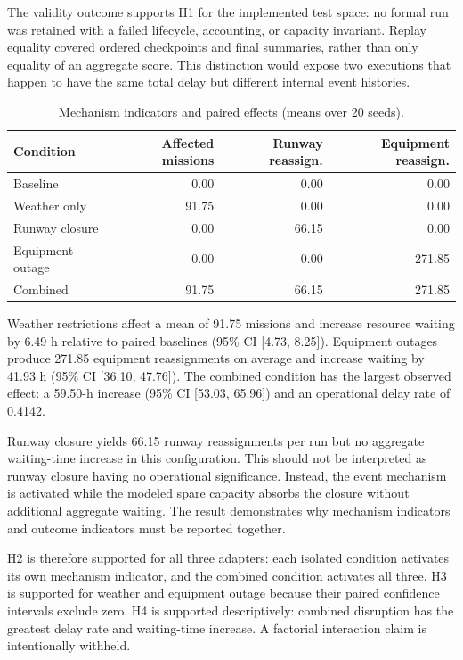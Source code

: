 \documentclass[runningheads]{llncs}
\begin{document}
The validity outcome supports H1 for the implemented test space: no formal run was retained with a failed lifecycle, accounting, or capacity invariant. Replay equality covered ordered checkpoints and final summaries, rather than only equality of an aggregate score. This distinction would expose two executions that happen to have the same total delay but different internal event histories.

\begin{table}[t]
\caption{Mechanism indicators and paired effects (means over 20 seeds).}\label{tab:mechanisms}
\centering\small
\begin{tabular}{lrrr}
\toprule
Condition & Affected missions & Runway reassign. & Equipment reassign. \\
\midrule
Baseline & 0.00 & 0.00 & 0.00 \\
Weather only & 91.75 & 0.00 & 0.00 \\
Runway closure & 0.00 & 66.15 & 0.00 \\
Equipment outage & 0.00 & 0.00 & 271.85 \\
Combined & 91.75 & 66.15 & 271.85 \\
\bottomrule
\end{tabular}
\end{table}

Weather restrictions affect a mean of 91.75 missions and increase resource waiting by 6.49 h relative to paired baselines (95\% CI [4.73, 8.25]). Equipment outages produce 271.85 equipment reassignments on average and increase waiting by 41.93 h (95\% CI [36.10, 47.76]). The combined condition has the largest observed effect: a 59.50-h increase (95\% CI [53.03, 65.96]) and an operational delay rate of 0.4142.

Runway closure yields 66.15 runway reassignments per run but no aggregate waiting-time increase in this configuration. This should not be interpreted as runway closure having no operational significance. Instead, the event mechanism is activated while the modeled spare capacity absorbs the closure without additional aggregate waiting. The result demonstrates why mechanism indicators and outcome indicators must be reported together.

H2 is therefore supported for all three adapters: each isolated condition activates its own mechanism indicator, and the combined condition activates all three. H3 is supported for weather and equipment outage because their paired confidence intervals exclude zero. H4 is supported descriptively: combined disruption has the greatest delay rate and waiting-time increase. A factorial interaction claim is intentionally withheld.
\end{document}
